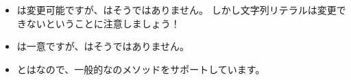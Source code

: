 \documentclass[a4paper,10pt,twoside]{book}
\begin{document}
\begin{itemize}
  \item {}は変更可能ですが、はそうではありません。
  しかし文字列リテラルは変更できないということに注意しましょう！

  \item {}は一意ですが、はそうではありません。

  \item {}とはなので、一般的なのメソッドをサポートしています。

\end{itemize}

\ifx\wholebook\relax\else
   
   
\end{document}
